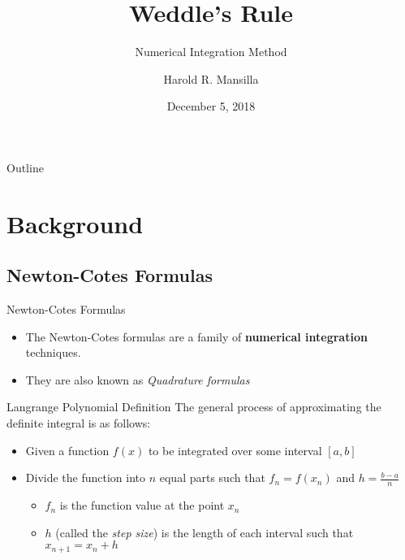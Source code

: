 \documentclass{beamer}
\title{Weddle's Rule}
\subtitle{Numerical Integration Method}
\author{Harold R. Mansilla\inst{1}}
\institute[University of the Philippines Manila] %
{
  \inst{1}%
  Department of Physical Sciences and Mathematics\\
  University of the Philippines Manila
}
\date{December 5, 2018}
\begin{document}
\begin{frame}
  \titlepage
\end{frame}

\begin{frame}[allowframebreaks]{Outline}
  \tableofcontents
\end{frame}

\section{Background}

\subsection{Newton-Cotes Formulas}

\begin{frame}{Newton-Cotes Formulas}
  \begin{itemize}
    \item The \alert{Newton-Cotes formulas} are a family of \textbf{numerical integration} techniques. \pause 
    \item They are also known as \textit{Quadrature formulas}
  \end{itemize}
\end{frame}

\begin{frame}{Langrange Polynomial Definition}
  The general process of approximating the definite integral is as follows:
    \begin{itemize}
       \item Given a function $f(x)$ to be integrated over some interval $[a,b]$ \pause
       \item Divide the function into $n$ equal parts such that $f_n = f(x_n)$ and $h = \frac{b - a}{n}$
       \begin{itemize}
         \item $f_n$ is the function value at the point $x_n$
         \item $h$ (called the \textit{step size}) is the length of each interval such that $x_{n+1} = x_n + h$
       \end{itemize}
    \end{itemize}
\end{frame}
\end{document}
